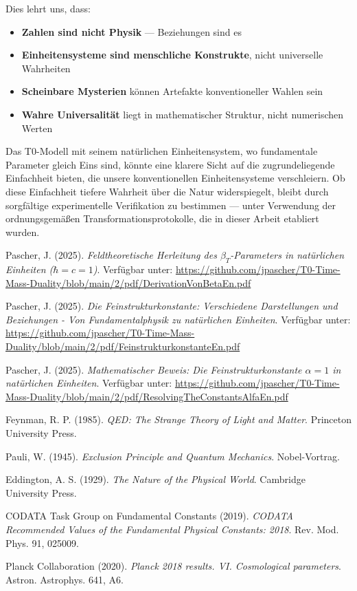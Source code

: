 \documentclass[12pt,a4paper]{article}
\begin{document}
	Dies lehrt uns, dass:
	\begin{itemize}
		\item \textbf{Zahlen sind nicht Physik} --- Beziehungen sind es
		\item \textbf{Einheitensysteme sind menschliche Konstrukte}, nicht universelle Wahrheiten  
		\item \textbf{Scheinbare Mysterien} können Artefakte konventioneller Wahlen sein
		\item \textbf{Wahre Universalität} liegt in mathematischer Struktur, nicht numerischen Werten
	\end{itemize}
	
	Das T0-Modell mit seinem natürlichen Einheitensystem, wo fundamentale Parameter gleich Eins sind, könnte eine klarere Sicht auf die zugrundeliegende Einfachheit bieten, die unsere konventionellen Einheitensysteme verschleiern. Ob diese Einfachheit tiefere Wahrheit über die Natur widerspiegelt, bleibt durch sorgfältige experimentelle Verifikation zu bestimmen --- unter Verwendung der ordnungsgemäßen Transformationsprotokolle, die in dieser Arbeit etabliert wurden.
	
	\begin{thebibliography}{9}
		Pascher, J. (2025). \textit{Feldtheoretische Herleitung des $\beta_T$-Parameters in natürlichen Einheiten ($\hbar = c = 1$)}. Verfügbar unter: \url{https://github.com/jpascher/T0-Time-Mass-Duality/blob/main/2/pdf/DerivationVonBetaEn.pdf}
		
		Pascher, J. (2025). \textit{Die Feinstrukturkonstante: Verschiedene Darstellungen und Beziehungen - Von Fundamentalphysik zu natürlichen Einheiten}. Verfügbar unter: \url{https://github.com/jpascher/T0-Time-Mass-Duality/blob/main/2/pdf/FeinstrukturkonstanteEn.pdf}
		
		Pascher, J. (2025). \textit{Mathematischer Beweis: Die Feinstrukturkonstante $\alpha = 1$ in natürlichen Einheiten}. Verfügbar unter: \url{https://github.com/jpascher/T0-Time-Mass-Duality/blob/main/2/pdf/ResolvingTheConstantsAlfaEn.pdf}
		
		Feynman, R. P. (1985). \textit{QED: The Strange Theory of Light and Matter}. Princeton University Press.
		
		Pauli, W. (1945). \textit{Exclusion Principle and Quantum Mechanics}. Nobel-Vortrag.
		
		Eddington, A. S. (1929). \textit{The Nature of the Physical World}. Cambridge University Press.
		
		CODATA Task Group on Fundamental Constants (2019). \textit{CODATA Recommended Values of the Fundamental Physical Constants: 2018}. Rev. Mod. Phys. 91, 025009.
		
		Planck Collaboration (2020). \textit{Planck 2018 results. VI. Cosmological parameters}. Astron. Astrophys. 641, A6.
	\end{thebibliography}
	
	
\end{document}
